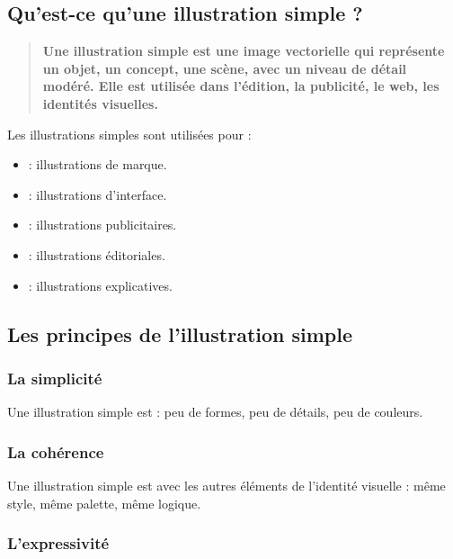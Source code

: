 \subsection{Qu'est-ce qu'une illustration simple ?}

\begin{quote}
\textbf{Une illustration simple est une image vectorielle qui représente un objet, un concept, une scène, avec un niveau de détail modéré. Elle est utilisée dans l'édition, la publicité, le web, les identités visuelles.}
\end{quote}

Les illustrations simples sont utilisées pour :

\begin{itemize}
    \item {} : illustrations de marque.
    \item {} : illustrations d'interface.
    \item {} : illustrations publicitaires.
    \item {} : illustrations éditoriales.
    \item {} : illustrations explicatives.
\end{itemize}

\subsection{Les principes de l'illustration simple}

\subsubsection{La simplicité}

Une illustration simple est  : peu de formes, peu de détails, peu de couleurs.

\subsubsection{La cohérence}

Une illustration simple est  avec les autres éléments de l'identité visuelle : même style, même palette, même logique.

\subsubsection{L'expressivité}

